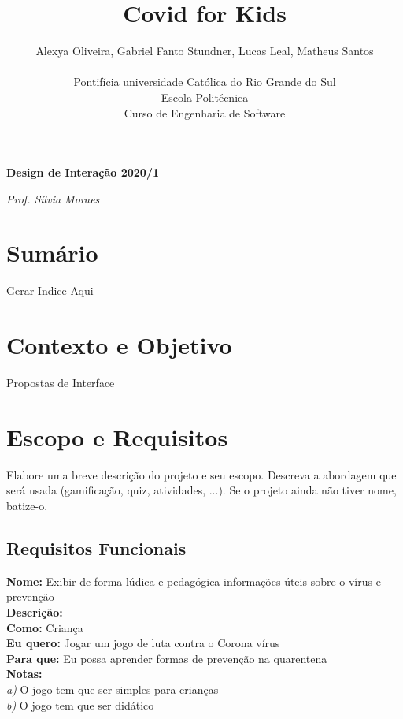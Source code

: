 \documentclass[12pt,brazil,a4paper]{article}
\begin{document}
\title{\textbf{Covid for Kids}}
\author{Alexya Oliveira, Gabriel Fanto Stundner, Lucas Leal, Matheus Santos \\ \\ Pontifícia universidade Católica do Rio Grande do Sul \\ Escola Politécnica \\ Curso de Engenharia de Software}
\maketitle

\textbf{Design de Interação 2020/1}

\textit{Prof. Sílvia Moraes}


\section{Sumário}
\begin{description}
Gerar Indice Aqui
\end{description}
\section{Contexto e Objetivo}
\begin{description}
Propostas de Interface
\end{description}
\section{Escopo e Requisitos}
\begin{description}
Elabore uma breve descrição do projeto e seu escopo. Descreva a abordagem que será usada (gamificação, quiz, atividades, ...). Se o projeto ainda não tiver nome, batize-o. 
\end{description}
\subsection{Requisitos Funcionais}
\begin{tcolorbox}
\textbf{Nome: } Exibir de forma lúdica e pedagógica informações úteis sobre o vírus e prevenção \\
\textbf{Descrição: } \\
\tab\tab \textbf{Como: } Criança    \\
\tab\tab \textbf{Eu quero: } Jogar um jogo de luta contra o Corona vírus\\
\tab\tab \textbf{Para que: } Eu possa aprender formas de prevenção na quarentena\\
\textbf{Notas: } \\
\textit{a) } O jogo tem que ser simples para crianças\\
\textit{b) } O jogo tem que ser didático   
\end{tcolorbox}
\end{document}
